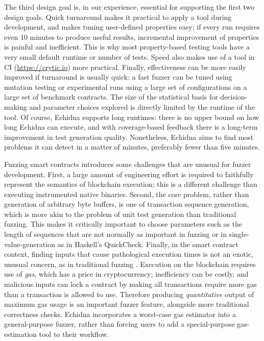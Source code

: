 The third design goal is, in our experience, essential for supporting the first two design goals.  Quick turnaround makes it practical to apply a tool during development, and makes tuning user-defined properties easy; if every run requires even 10 minutes to produce useful results, incremental improvement of properties is painful and inefficient.  This is why most property-based testing tools have a very small default runtime or number of tests.  Speed also makes use of a tool in CI (\url{https://crytic.io}) more practical. Finally, effectiveness can be more easily improved if turnaround is usually quick: a fast fuzzer can be tuned using mutation testing \cite{MutationSurvey} or experimental runs using a large set of configurations on a large set of benchmark contracts.  The size of the statistical basis for decision-making and parameter choices explored is directly limited by the runtime of the tool.  Of course, Echidna supports long runtimes:  there is no upper bound on how long Echidna can execute, and with coverage-based feedback there is a long-term improvement in test generation quality.  Nonetheless, Echidna aims to find most problems it can detect in a matter of minutes, preferably fewer than five minutes.

Fuzzing smart contracts introduces some challenges that are unusual for fuzzer development.  First, a large amount of engineering effort is required to faithfully represent the semantics of blockchain execution; this is a different challenge than executing instrumented native binaries.  Second, the core problem, rather than generation of arbitrary byte buffers, is one of transaction sequence generation, which is more akin to the problem of unit test generation \cite{Pacheco} than traditional fuzzing.  This makes it critically important to choose parameters such as the length of sequences \cite{ASE08} that are not normally as important in fuzzing or in single-value-generation as in Haskell's QuickCheck.  Finally, in the smart contract context, finding inputs that cause pathological execution times is not an exotic, unusual concern, as in traditional fuzzing \cite{lemieux2018perffuzz}.  Execution on the blockchain requires use of \emph{gas}, which has a price in cryptocurrency; inefficiency can be costly, and malicious inputs can lock a contract by making all transactions require more gas than a transaction is allowed to use.  Therefore producing \emph{quantitative} output of maximum gas usage is an important fuzzer feature, alongside more traditional correctness checks.  Echidna incorporates a worst-case gas estimator into a general-purpose fuzzer, rather than forcing users to add a special-purpose gas-estimation tool \cite{albert2019gasol,ma2019gasfuzz} to their workflow.
